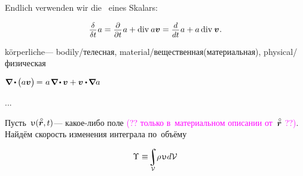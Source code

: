 \begin{tcolorbox}[breakable, enhanced, colback = orange!8, before upper={\parindent3.2ex}, parbox = false]
Endlich verwenden wir die~ eines Skalars:

\nopagebreak\vspace{-0.1em}\begin{equation*}
\scalebox{0.92}[0.92]{$\displaystyle\frac{\raisemath{-0.125em}{\delta}}{\delta t}$} \hspace{.15ex} a
= \scalebox{0.92}[0.92]{$\displaystyle\frac{\raisemath{-0.125em}{\partial}}{\partial t}$} \hspace{.15ex} a + \operatorname{div}\hspace{.1ex} a \bm{v}
= \scalebox{0.92}[0.92]{$\displaystyle\frac{\raisemath{-0.125em}{d}}{dt}$} \hspace{.15ex} a + a \operatorname{div}\hspace{.1ex} \bm{v}
\hspace{.1ex} .
\end{equation*}
\par
\end{tcolorbox}

\begin{otherlanguage}{russian}

körperliche\:--- bodily/телесная, material/вещественная(материальная), physical/физическая

${
\boldnabla \hspace{-0.1ex} \dotp \hspace{-0.15ex} \bigl( a \bm{v} \bigr) \hspace{-0.2ex} = \hspace{.1ex} a \hspace{.2ex} \boldnabla \hspace{-0.2ex} \dotp \hspace{-0.1ex} \bm{v} + \bm{v} \dotp \hspace{-0.2ex} \boldnabla a
}$

...

Пусть~${\upupsilon(\initiallocationvector, t)}$\:--- какое\hbox{-}либо поле \textcolor{magenta}{(?? только в~материальном описании от~${\initiallocationvector}$ ??)}.
Найдём скорость изменения интеграла по~объёму

\end{otherlanguage}

\nopagebreak\vspace{-0.25em}\begin{equation*}
\Upsilon
\equiv \hspace{-0.4ex} \scalebox{0.9}{$\displaystyle\integral\displaylimits_{\mathcal{V}}$} \hspace{-0.1ex} \rho \hspace{.19ex} \upupsilon \hspace{.11ex} d\mathcal{V}
\end{equation*}

